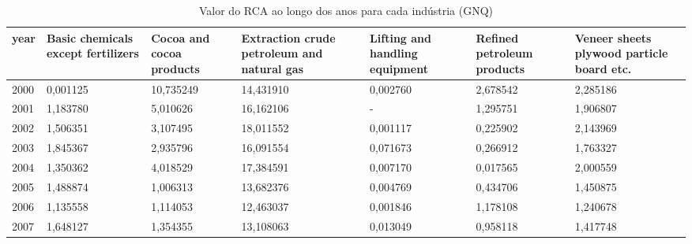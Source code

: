 \begin{table}
\centering
\caption{Valor do RCA ao longo dos anos para cada indústria (GNQ)}
\begin{tabular}{p{1cm}p{2cm}p{2cm}p{2cm}p{2cm}p{2cm}p{2cm}}
\toprule
 year &  Basic chemicals except fertilizers &  Cocoa and cocoa products &  Extraction crude petroleum and natural gas &  Lifting and handling equipment &  Refined petroleum products &  Veneer sheets plywood particle board etc. \\
\midrule
 2000 &                            0,001125 &                 10,735249 &                                   14,431910 &                        0,002760 &                    2,678542 &                                   2,285186 \\
 2001 &                            1,183780 &                  5,010626 &                                   16,162106 &                               - &                    1,295751 &                                   1,906807 \\
 2002 &                            1,506351 &                  3,107495 &                                   18,011552 &                        0,001117 &                    0,225902 &                                   2,143969 \\
 2003 &                            1,845367 &                  2,935796 &                                   16,091554 &                        0,071673 &                    0,266912 &                                   1,763327 \\
 2004 &                            1,350362 &                  4,018529 &                                   17,384591 &                        0,007170 &                    0,017565 &                                   2,000559 \\
 2005 &                            1,488874 &                  1,006313 &                                   13,682376 &                        0,004769 &                    0,434706 &                                   1,450875 \\
 2006 &                            1,135558 &                  1,114053 &                                   12,463037 &                        0,001846 &                    1,178108 &                                   1,240678 \\
 2007 &                            1,648127 &                  1,354355 &                                   13,108063 &                        0,013049 &                    0,958118 &                                   1,417748 \\

\end{tabular}
\end{table}
